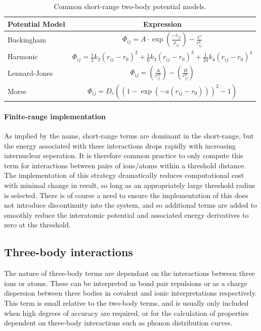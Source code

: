 \begin{table}[t]
  \centering
  \caption{Common short-range two-body potential models.\cite{Gale2003}}
  \label{tab:potentialmodels}
  \begin{tabular}{@{}lc@{}}
  \toprule
  Potential Model         & Expression     \\
  \midrule
  Buckingham              & $\displaystyle{\Phi_{ij} = A\cdot \exp \left(\frac{-r_{ij}}{\rho_{ij}} \right) - \frac{C}{r_{ij}^6}}$    \\
  \addlinespace
  Harmonic                & $\displaystyle{\Phi_{ij} = \frac{1}{2}k_2(r_{ij}-r_0)^2   + \frac{1}{6}k_3(r_{ij}-r_0)^3    + \frac{1}{24}k_4(r_{ij}-r_0)^4   }$    \\
  \addlinespace
  Lennard-Jones           & $\displaystyle{\Phi_{ij} = \left(\frac{A}{r_{ij}^m} \right) - \left( \frac{B}{r_{ij}^n}\right)}$   \\
  \addlinespace
  Morse                   & $\displaystyle{\Phi_{ij} = D_e \left((1- \exp(-a(r_{ij} - r_0)))^2           -1\right) }$    \\
  \bottomrule
  \end{tabular}
\end{table}

\vspace{-5pt}
\paragraph{Finite-range implementation}

As implied by the name, short-range terms are dominant in the short-range, but the energy associated with these interactions drops rapidly with increasing internuclear seperation.
It is therefore common practice to only compute this term for interactions between pairs of ions/atoms within a threshold distance.
The implementation of this strategy dramatically reduces computational cost with minimal change in result, so long as an appropriately large threshold radius is selected.
There is of course a need to ensure the implementation of this does not introduce discontinuity into the system, and so additional terms are added to smoothly reduce the interatomic potential and associated energy derivatives to zero at the threshold.


\subsection{Three-body interactions}
The nature of three-body terms are dependant on the interactions between three ions or atoms.
These can be interpreted as bond pair repulsions or as a charge dispersion between three bodies in covalent and ionic interpretations respectively.
This term is small relative to the two-body terms, and is usually only included when high degrees of accuracy are required, or for the calculation of properties dependent on three-body interactions such as phonon distribution curves.

